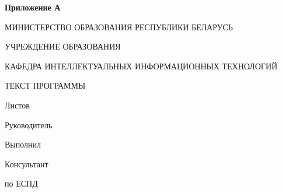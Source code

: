 \begin{flushright}
    \textbf{Приложение А}
\end{flushright}
\begin{center}
    МИНИСТЕРСТВО ОБРАЗОВАНИЯ РЕСПУБЛИКИ БЕЛАРУСЬ

    УЧРЕЖДЕНИЕ ОБРАЗОВАНИЯ

    КАФЕДРА ИНТЕЛЛЕКТУАЛЬНЫХ ИНФОРМАЦИОННЫХ ТЕХНОЛОГИЙ
\end{center}

\vfill

\begin{center}
    \TitlePageTopic
\end{center}

\vfill

\begin{center}
    ТЕКСТ ПРОГРАММЫ
\end{center}

\vfill

\begin{center}
    \codeAttachmentSignature
\end{center}

\vfill


\begin{center}
    Листов~\pageref{LastPage}
\end{center}

\vfill

\begin{flushright}
    \begin{minipage}[t]{7cm}
        Руководитель

        \vspace{4mm}

        Выполнил

        \vspace{4mm}

        Консультант

        по ЕСПД
    \end{minipage}
    \begin{minipage}[t]{7cm}
        \titlePageTeacherSurname~\titlePageTeacherName

        \vspace{4mm}

        \titlePageStudentSurname~\titlePageStudentName

        \vspace{4mm}

        \titlePageTeacherSurname~\titlePageTeacherName
    \end{minipage}
\end{flushright}

\vfill

\begin{center}
    \titlePageCity~\ESKDtheYear
\end{center}


